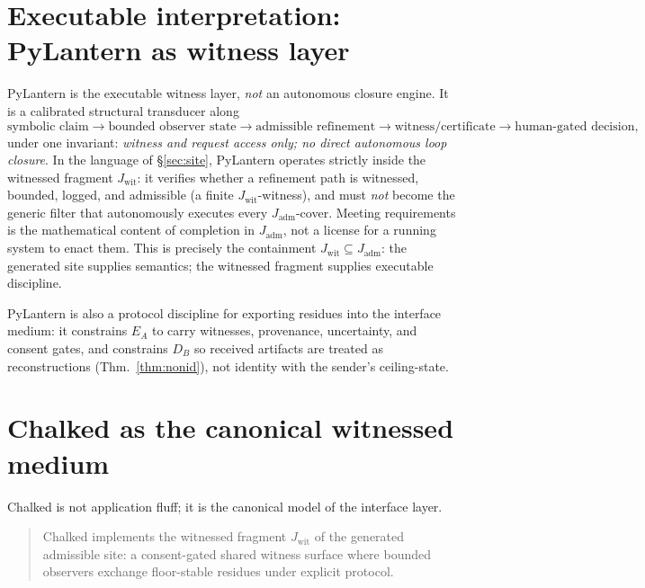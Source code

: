 \documentclass[11pt]{article}
\theoremstyle{definition}
\theoremstyle{remark}
\newcommand{\Jadm}{J_{\mathrm{adm}}}
\newcommand{\Jwit}{J_{\mathrm{wit}}}
\begin{document}
\section{Executable interpretation: PyLantern as witness layer}\label{sec:pylantern}

PyLantern is the executable witness layer, \emph{not} an autonomous closure engine. It is a calibrated
structural transducer along
\[
  \text{symbolic claim} \to \text{bounded observer state} \to \text{admissible refinement}
  \to \text{witness/certificate} \to \text{human-gated decision},
\]
under one invariant: \emph{witness and request access only; no direct autonomous loop closure}.
In the language of \S\ref{sec:site}, PyLantern operates strictly inside the witnessed fragment
$\Jwit$: it verifies whether a refinement path is witnessed, bounded, logged, and admissible (a finite
$\Jwit$-witness), and must \emph{not} become the generic filter that autonomously executes every
$\Jadm$-cover. Meeting requirements is the mathematical content of completion in $\Jadm$, not a license
for a running system to enact them. This is precisely the containment $\Jwit\subseteq\Jadm$: the
generated site supplies semantics; the witnessed fragment supplies executable discipline.

PyLantern is also a protocol discipline for exporting residues into the interface medium: it
constrains $E_A$ to carry witnesses, provenance, uncertainty, and consent gates, and constrains $D_B$
so received artifacts are treated as reconstructions (Thm.~\ref{thm:nonid}), not identity with the
sender's ceiling-state.

\section{Chalked as the canonical witnessed medium}\label{sec:chalked}

Chalked is not application fluff; it is the canonical model of the interface layer.

\begin{quote}
Chalked implements the witnessed fragment $\Jwit$ of the generated admissible site: a consent-gated
shared witness surface where bounded observers exchange floor-stable residues under explicit protocol.
\end{quote}
\end{document}
